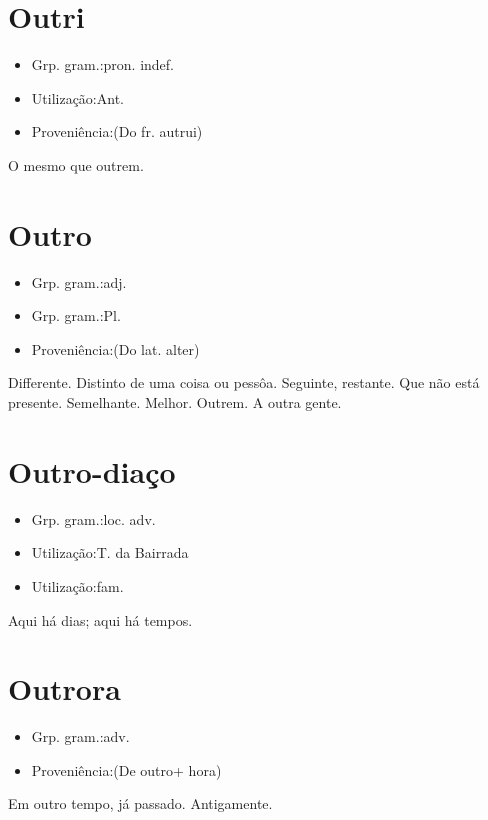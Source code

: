 \section{Outri}
\begin{itemize}
\item {Grp. gram.:pron. indef.}
\end{itemize}
\begin{itemize}
\item {Utilização:Ant.}
\end{itemize}
\begin{itemize}
\item {Proveniência:(Do fr. \textunderscore autrui\textunderscore )}
\end{itemize}
O mesmo que \textunderscore outrem\textunderscore .
\section{Outro}
\begin{itemize}
\item {Grp. gram.:adj.}
\end{itemize}
\begin{itemize}
\item {Grp. gram.:Pl.}
\end{itemize}
\begin{itemize}
\item {Proveniência:(Do lat. \textunderscore alter\textunderscore )}
\end{itemize}
Differente.
Distinto de uma coisa ou pessôa.
Seguinte, restante.
Que não está presente.
Semelhante.
Melhor.
Outrem.
A outra gente.
\section{Outro-diaço}
\begin{itemize}
\item {Grp. gram.:loc. adv.}
\end{itemize}
\begin{itemize}
\item {Utilização:T. da Bairrada}
\end{itemize}
\begin{itemize}
\item {Utilização:fam.}
\end{itemize}
Aqui há dias; aqui há tempos.
\section{Outrora}
\begin{itemize}
\item {Grp. gram.:adv.}
\end{itemize}
\begin{itemize}
\item {Proveniência:(De \textunderscore outro\textunderscore  + \textunderscore hora\textunderscore )}
\end{itemize}
Em outro tempo, já passado.
Antigamente.
